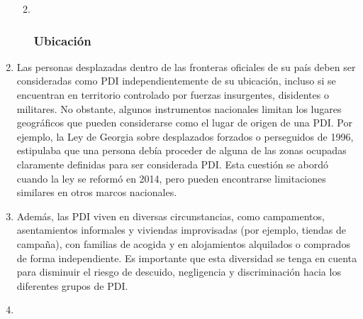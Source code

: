 \documentclass[
]{book}
\begin{document}
\begin{enumerate}
  \begin{enumerate}
  \def\labelenumii{\arabic{enumii}.}
  \item ~
    \hypertarget{ubicaciuxf3n}{%
    \subsubsection{Ubicación}\label{ubicaciuxf3n}}
  \end{enumerate}
\item
  Las personas desplazadas dentro de las fronteras oficiales de su país deben ser consideradas como PDI independientemente de su ubicación, incluso si se encuentran en territorio controlado por fuerzas insurgentes, disidentes o militares. No obstante, algunos instrumentos nacionales limitan los lugares geográficos que pueden considerarse como el lugar de origen de una PDI. Por ejemplo, la Ley de Georgia sobre desplazados forzados o perseguidos de 1996, estipulaba que una persona debía proceder de alguna de las zonas ocupadas claramente definidas para ser considerada PDI. Esta cuestión se abordó cuando la ley se reformó en 2014, pero pueden encontrarse limitaciones similares en otros marcos nacionales.
\item
  Además, las PDI viven en diversas circunstancias, como campamentos, asentamientos informales y viviendas improvisadas (por ejemplo, tiendas de campaña), con familias de acogida y en alojamientos alquilados o comprados de forma independiente. Es importante que esta diversidad se tenga en cuenta para disminuir el riesgo de descuido, negligencia y discriminación hacia los diferentes grupos de PDI.
\item ~
  \hypertarget{soluciones-duraderas-y-fin-de-los-desplazamientos-internos}{%
}
\end{enumerate}
\end{document}
